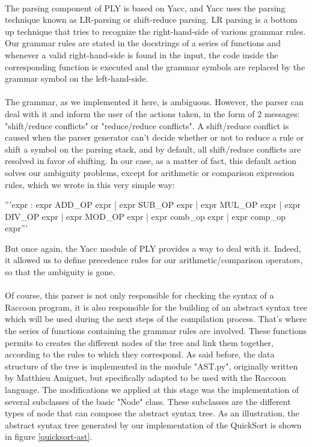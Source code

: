 \documentclass[12pt,a4paper]{article}
\begin{document}
\paragraph{}
The parsing component of PLY is based on Yacc, and Yacc uses the parsing technique known as LR-parsing or shift-reduce parsing. LR parsing is a bottom up technique that tries to recognize the right-hand-side of various grammar rules. Our grammar rules are stated in the docstrings of a series of functions and whenever a valid right-hand-side is found in the input, the code inside the corresponding function is executed and the grammar symbols are replaced by the grammar symbol on the left-hand-side.

\paragraph{}
The grammar, as we implemented it here, is ambiguous. However, the parser can deal with it and inform the user of the actions taken, in the form of 2 messages: "shift/reduce conflicts" or "reduce/reduce conflicts". A shift/reduce conflict is caused when the parser generator can't decide whether or not to reduce a rule or shift a symbol on the parsing stack, and by default, all shift/reduce conflicts are resolved in favor of shifting. In our case, as a matter of fact, this default action solves our ambiguity problems, except for arithmetic or comparison expression rules, which we wrote in this very simple way:
\begin{verbatimtab}[4]
	'''expr : expr ADD_OP expr
			| expr SUB_OP expr
			| expr MUL_OP expr
			| expr DIV_OP expr
			| expr MOD_OP expr
			| expr comb_op expr
			| expr comp_op expr'''
\end{verbatimtab} 
But once again, the Yacc module of PLY provides a way to deal with it. Indeed, it allowed us to define precedence rules for our arithmetic/comparison operators, so that the ambiguity is gone.

\paragraph{}
Of course, this parser is not only responsible for checking the syntax of a Raccoon program, it is also responsible for the building of an abstract syntax tree which will be used during the next steps of the compilation process. That's where the series of functions containing the grammar rules are involved. These functions permits to creates the different nodes of the tree and link them together, according to the rules to which they correspond. As said before, the data structure of the tree is implemented in the module "AST.py", originally written by Matthieu Amiguet,  but specifically adapted to be used with the Raccoon language. The modifications we applied at this stage was the implementation of several subclasses of the basic "Node" class. These subclasses are the different types of node that can compose the abstract syntax tree. As an illustration, the abstract syntax tree generated by our implementation of the QuickSort is shown in figure \ref{quicksort-ast}.
\end{document}
